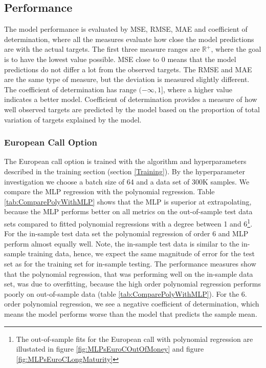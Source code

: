 \subsection{Performance}
The model performance is evaluated by MSE, RMSE, MAE and coefficient of determination, where all the measures evaluate how close the model predictions are with the actual targets. The first three measure ranges are $\mathbb{R}^+$, where the goal is to have the lowest value possible. MSE close to 0 means that the model predictions do not differ a lot from the observed targets. The RMSE and MAE are the same type of measure, but the deviation is measured slightly different. The coefficient of determination has range $(-\infty, 1]$, where a higher value indicates a better model. Coefficient of determination provides a measure of how well observed targets are predicted by the model based on the proportion of total variation of targets explained by the model.

\subsubsection{European Call Option}
The European call option is trained with the algorithm and hyperparameters described in the training section (section \ref{Training}). By the hyperparameter investigation we choose a batch size of 64 and a data set of 300K samples. We compare the MLP regression with the polynomial regression. Table \ref{tab:ComparePolyWithMLP} shows that the MLP is superior at extrapolating, because the MLP performs better on all metrics on the out-of-sample test data sets compared to fitted polynomial regressions with a degree between 1 and 6\footnote{The out-of-sample fits for the European call with polynomial regression are illustated in figure \ref{fig:MLPsEuroCOutOfMoney} and figure \ref{fig:MLPsEuroCLongMaturity}}. For the in-sample test data set the polynomial regression of order 6 and MLP perform almost equally well. Note, the in-sample test data is similar to the in-sample training data, hence, we expect the same magnitude of error for the test set as for the training set for in-sample testing. The performance measures show that the polynomial regression, that was performing well on the in-sample data set, was due to overfitting, because the high order polynomial regression performs poorly on out-of-sample data (table \ref{tab:ComparePolyWithMLP}). For the 6. order polynomial regression, we see a negative coefficient of determination, which means the model performs worse than the model that predicts the sample mean. \\

